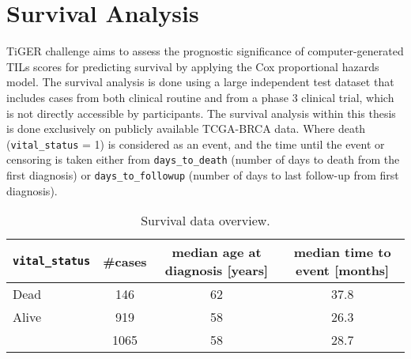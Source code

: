 \section{Survival Analysis}
TiGER challenge aims to assess the prognostic significance of computer-generated TILs scores
for predicting survival by applying the Cox proportional hazards model. The survival analysis
is done using a large independent test dataset that includes cases from both clinical routine and from a phase 3 clinical trial, which is not directly accessible by participants. The survival analysis
within this thesis is done exclusively on publicly available TCGA-BRCA data. Where death
(\texttt{vital\_status} = 1) is considered as an event, and the time until the event or censoring is
taken either from \texttt{days\_to\_death} (number of days to death from the first diagnosis) or \texttt{days\_to\_followup}
(number of days to last follow-up from first diagnosis). 
\begin{table}[h!]
\centering
\begin{tabular}{ l c c c } 
\hline
\texttt{vital\_status} & \#cases & median age at diagnosis [years] & median time to event [months]\\ 
\hline
Dead & 146 & 62 & 37.8\\ 
Alive & 919 & 58 & 26.3\\ 
\hline
 & 1065 & 58 & 28.7\\
\end{tabular}
\caption{\label{tab:surv_data}Survival data overview.}
\end{table}
